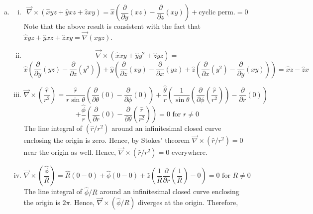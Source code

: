 \documentclass[solutions]{esg8022pset}
\newcommand{\dx}{\frac{\partial}{\partial x}}
\newcommand{\dy}{\frac{\partial}{\partial y}}
\newcommand{\dz}{\frac{\partial}{\partial z}}
\newcommand{\dtheta}{\frac{\partial}{\partial \theta}}
\newcommand{\dr}{\frac{\partial}{\partial r}}
\begin{document}
\begin{enumerate}[(a)]
\begin{enumerate}[(i)]
      \end{enumerate}
    \item
      \begin{enumerate}[(i)]
        \item  $${\vec{\nabla} \times \left( \hat{x} yz + \hat{y} xz + \hat{z} xy \right)} = \hat x\left( \dy\left( xz \right) - \dz(xy) \right) + \text{cyclic perm.} =0 $$
          Note that the above result is consistent with the fact that $\hat{x} yz + \hat{y} xz + \hat{z} xy = \vec{\nabla} (xyz)$.
        \item $$ {\vec{\nabla} \times \left( \hat{x} xy + \hat{y} y^2 + \hat{z} yz \right)} =$$ $$\hat x\left( \dy(yz) - \dz(y^2) \right) + \hat y\left( \dz(xy) - \dx(yz) + \hat z\left( \dx(y^2) - \dy(xy) \right)\right) = \hat x z - \hat z x$$
        \item $${\vec{\nabla} \times \left( \frac{\hat r}{r^2} \right)} = \frac{\hat r}{r \sin \theta} \left( \dtheta \left( 0 \right) - \frac{\partial}{\partial \phi} \left( 0 \right)\right) + \frac{\hat\theta}{r} \left( \frac{1}{\sin \theta} \left( \frac{\partial}{\partial \phi} \left(\frac{\hat r}{r^2} \right) \right)-   \dr \left( 0 \right) \right)$$ $$+  \frac{\hat\phi}{r} \left( \dr \left( 0 \right) - \dtheta \left( \frac{\hat r}{r^2}\right) \right) = 0\text{ for }r \neq 0$$
          The line integral of $\left( \hat r / r^2 \right)$ around an infinitesimal closed curve enclosing the origin is zero. Hence, by Stokes' theorem $\vec{\nabla}\times\left({\hat r/r^2}\right) = 0$ near the origin as well. Hence, ${\vec{\nabla} \times \left( { \hat r / r^2} \right)} = 0$ everywhere.
        \item $${\vec{\nabla} \times \left( \frac{ \hat\phi}{R} \right)} = \hat{R} \left( 0 -0 \right) + \hat\phi \left( 0 - 0\right) + \hat z \left( \frac{1}{R} \dr \left( \frac{1}{R} \right) - 0 \right) = 0\text{ for }R \neq 0 $$
          The line integral  of ${ \hat\phi / R} $ around an infinitesimal closed curve enclosing the origin is $2\pi$. Hence, ${\vec{\nabla} \times \left( { \hat\phi / R} \right)}$ diverges at the origin. Therefore,

\end{enumerate}
\end{enumerate}
\end{document}
